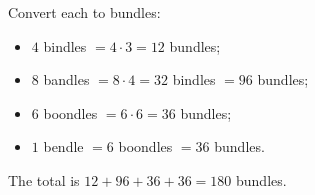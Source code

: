 Convert each to bundles:
\begin{itemize}
\item $4$ bindles $=4\cdot3=12$ bundles;
\item $8$ bandles $=8\cdot4=32$ bindles $=96$ bundles;
\item $6$ boondles $=6\cdot6=36$ bundles;
\item $1$ bendle $=6$ boondles $=36$ bundles.
\end{itemize}
The total is $12+96+36+36=\boxed{180}$ bundles.
